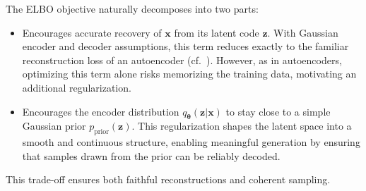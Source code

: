 The ELBO objective naturally decomposes into two parts:
\begin{itemize}
    \item {} Encourages accurate recovery of $\mathbf{x}$ from its latent code $\mathbf{z}$. With Gaussian encoder and decoder assumptions, this term reduces exactly to the familiar reconstruction loss of an autoencoder (cf.\ ). However, as in autoencoders, optimizing this term alone risks memorizing the training data, motivating an additional regularization.
    \item {} Encourages the encoder distribution $q_{\bm{\theta}}(\mathbf{z}|\mathbf{x})$ to stay close to a simple Gaussian prior $p_{\mathrm{prior}}(\mathbf{z})$. This regularization shapes the latent space into a smooth and continuous structure, enabling meaningful generation by ensuring that samples drawn from the prior can be reliably decoded.
\end{itemize}
This trade-off ensures both faithful reconstructions and coherent sampling.

